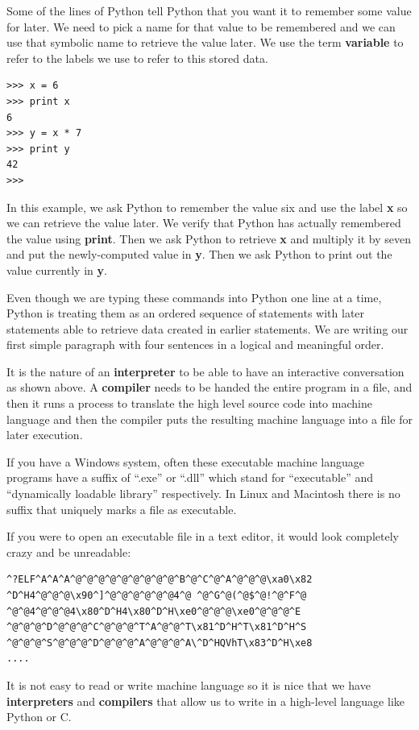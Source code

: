 Some of the lines of Python tell Python that you want it to remember some 
value for later.   We need to pick a name for that value to be remembered and
we can use that symbolic name to retrieve the value later.  We use the 
term {\bf variable} to refer to the labels we use to refer to this stored data.

\beforeverb
\begin{verbatim}
>>> x = 6
>>> print x
6
>>> y = x * 7
>>> print y
42
>>> 
\end{verbatim}
\afterverb
%
In this example, we ask Python to remember the value six and use the label {\bf x}
so we can retrieve the value later.   We verify that Python has actually remembered
the value using {\bf print}. Then we ask Python to retrieve {\bf x} and multiply
it by seven and put the newly-computed value in {\bf y}.  Then we ask Python to print out
the value currently in {\bf y}.

Even though we are typing these commands into Python one line at a time, Python
is treating them as an ordered sequence of statements with later statements able
to retrieve data created in earlier statements.   We are writing our first 
simple paragraph with four sentences in a logical and meaningful order.

It is the nature of an {\bf interpreter} to be able to have an interactive conversation
as shown above.  A {\bf compiler} needs to be handed the entire program in a file, and then 
it runs a process to translate the high level source code into machine language
and then the compiler puts the resulting machine language into a file for later
execution.

If you have a Windows system, often these executable machine language programs have a
suffix of ``.exe'' or ``.dll'' which stand for ``executable'' and ``dynamically loadable
library'' respectively.  In Linux and Macintosh there is no suffix that uniquely marks
a file as executable.

If you were to open an executable file in a text editor, it would look 
completely crazy and be unreadable:

\beforeverb
\begin{verbatim}
^?ELF^A^A^A^@^@^@^@^@^@^@^@^@^B^@^C^@^A^@^@^@\xa0\x82
^D^H4^@^@^@\x90^]^@^@^@^@^@^@4^@ ^@^G^@(^@$^@!^@^F^@
^@^@4^@^@^@4\x80^D^H4\x80^D^H\xe0^@^@^@\xe0^@^@^@^E
^@^@^@^D^@^@^@^C^@^@^@^T^A^@^@^T\x81^D^H^T\x81^D^H^S
^@^@^@^S^@^@^@^D^@^@^@^A^@^@^@^A\^D^HQVhT\x83^D^H\xe8
....
\end{verbatim}
\afterverb
%
It is not easy to read or write machine language so it is nice that we have
{\bf interpreters} and {\bf compilers} that allow us to write in a high-level
language like Python or C.

